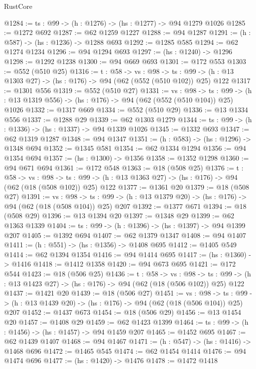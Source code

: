 \begin{lexlean}{RustCore}
\begin{coremodule}
@1284 := {ts : @99} -> (h : @1276) -> (hs : @1277) -> @94 @1279 @1026
@1285 := @1272 @692
@1287 := @62 @1259 @1227
@1288 := @94 @1287
@1291 := (h : @587) -> (hs : @1236) -> @1288 @693
@1292 := @1285 @585
@1294 := @62 @1274 @1234
@1296 := @94 @1294 @693
@1297 := (hs : @1240) -> @1296
@1298 := @1292 @1238
@1300 := @94 @669 @693
@1301 := @172 @553
@1303 := @552 (@510 @25)
@1316 := {t : @58} ->
  {vs : @98} ->
  {ts : @99} -> (h : @13 @1303 @27) -> (hs : @176) -> @94 (@62 (@552 (@510 @102)) @25) @122
@1317 := @1301 @556
@1319 := @552 (@510 @27)
@1331 := {vs : @98} ->
  {ts : @99} -> (h : @13 @1319 @556) -> (hs : @176) -> @94 (@62 (@552 (@510 @104)) @25) @1026
@1332 := @1317 @669
@1334 := @552 (@510 @29)
@1336 := @13 @1334 @556
@1337 := @1288 @29
@1339 := @62 @1303 @1279
@1344 := {ts : @99} -> (h : @1336) -> (hs : @1337) -> @94 @1339 @1026
@1345 := @1332 @693
@1347 := @62 @1319 @1287
@1348 := @94 @1347
@1351 := (h : @583) -> (hs : @1296) -> @1348 @694
@1352 := @1345 @581
@1354 := @62 @1334 @1294
@1356 := @94 @1354 @694
@1357 := (hs : @1300) -> @1356
@1358 := @1352 @1298
@1360 := @94 @671 @694
@1361 := @172 @548
@1363 := @18 (@508 @25)
@1376 := {t : @58} ->
  {vs : @98} ->
  {ts : @99} -> (h : @13 @1363 @27) -> (hs : @176) -> @94 (@62 (@18 (@508 @102)) @25) @122
@1377 := @1361 @20
@1379 := @18 (@508 @27)
@1391 := {vs : @98} ->
  {ts : @99} -> (h : @13 @1379 @20) -> (hs : @176) -> @94 (@62 (@18 (@508 @104)) @25) @207
@1392 := @1377 @671
@1394 := @18 (@508 @29)
@1396 := @13 @1394 @20
@1397 := @1348 @29
@1399 := @62 @1363 @1339
@1404 := {ts : @99} -> (h : @1396) -> (hs : @1397) -> @94 @1399 @207
@1405 := @1392 @694
@1407 := @62 @1379 @1347
@1408 := @94 @1407
@1411 := (h : @551) -> (hs : @1356) -> @1408 @695
@1412 := @1405 @549
@1414 := @62 @1394 @1354
@1416 := @94 @1414 @695
@1417 := (hs : @1360) -> @1416
@1418 := @1412 @1358
@1420 := @94 @673 @695
@1421 := @172 @544
@1423 := @18 (@506 @25)
@1436 := {t : @58} ->
  {vs : @98} ->
  {ts : @99} -> (h : @13 @1423 @27) -> (hs : @176) -> @94 (@62 (@18 (@506 @102)) @25) @122
@1437 := @1421 @20
@1439 := @18 (@506 @27)
@1451 := {vs : @98} ->
  {ts : @99} -> (h : @13 @1439 @20) -> (hs : @176) -> @94 (@62 (@18 (@506 @104)) @25) @207
@1452 := @1437 @673
@1454 := @18 (@506 @29)
@1456 := @13 @1454 @20
@1457 := @1408 @29
@1459 := @62 @1423 @1399
@1464 := {ts : @99} -> (h : @1456) -> (hs : @1457) -> @94 @1459 @207
@1465 := @1452 @695
@1467 := @62 @1439 @1407
@1468 := @94 @1467
@1471 := (h : @547) -> (hs : @1416) -> @1468 @696
@1472 := @1465 @545
@1474 := @62 @1454 @1414
@1476 := @94 @1474 @696
@1477 := (hs : @1420) -> @1476
@1478 := @1472 @1418

\end{coremodule}
\end{lexlean}
